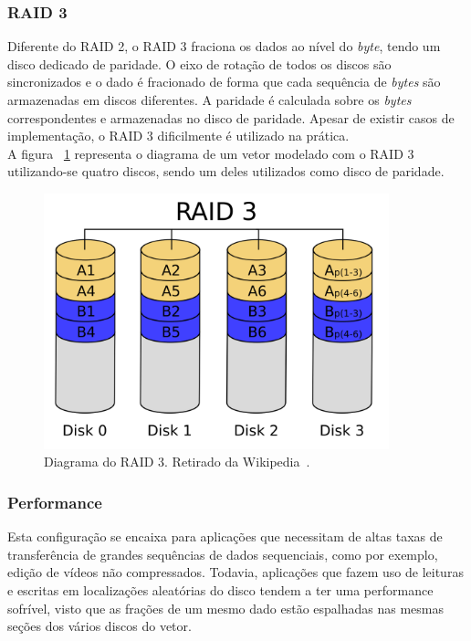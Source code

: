 	
		\subsubsection{RAID 3}
		
		Diferente do RAID 2, o RAID 3 fraciona os dados ao nível do \textit{byte}, tendo um disco dedicado de paridade. O eixo de rotação de todos os discos são sincronizados e o dado é fracionado de forma que cada sequência de \textit{bytes} são armazenadas em discos diferentes. A paridade é calculada sobre os \textit{bytes} correspondentes e armazenadas no disco de paridade. Apesar de existir casos de implementação, o RAID 3 dificilmente é utilizado na prática.\\
		
		A figura ~\ref{fig:raid3} representa o diagrama de um vetor modelado com o RAID 3 utilizando-se quatro discos, sendo um deles utilizados como disco de paridade.\\
		
		\begin{figure}[htb]
			\begin{center}
				
				\includegraphics[clip,width=10.0cm]{images/RAID_3.png}
				\caption{Diagrama do RAID 3. Retirado da Wikipedia~\citep{wikiRAIDlevels}.}
				\label{fig:raid3}
			\end{center}
		\end{figure} 
		
		\subsubsection{Performance}
		Esta configuração se encaixa para aplicações que necessitam de altas taxas de transferência de grandes sequências de dados sequenciais, como por exemplo, edição de vídeos não compressados. Todavia, aplicações que fazem uso de leituras e escritas em localizações aleatórias do disco tendem a ter uma performance sofrível, visto que as frações de um mesmo dado estão espalhadas nas mesmas seções dos vários discos do vetor.\\
		
